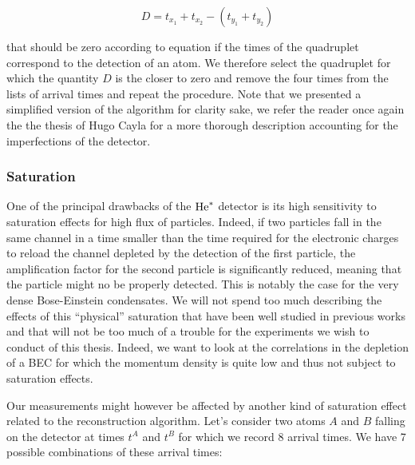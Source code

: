 \begin{equation}
    D = t_{x_1}+t_{x_2} - (t_{y_1}+t_{y_2})
\end{equation}

\noindent that should be zero according to equation \label{eq:tdet_MCP} if the times of the quadruplet correspond to the detection of an atom. We therefore select the quadruplet for which the quantity $D$ is the closer to zero and remove the four times from the lists of arrival times and repeat the procedure. Note that we presented a simplified version of the algorithm for clarity sake, we refer the reader once again the the thesis of Hugo Cayla \cite{cayla_these} for a more thorough description accounting for the imperfections of the detector.

\subsubsection{Saturation}

One of the principal drawbacks of the $\mathrm{He}^*$ detector is its high sensitivity to saturation effects for high flux of particles. Indeed, if two particles fall in the same channel in a time smaller than the time required for the electronic charges to reload the channel depleted by the detection of the first particle, the amplification factor for the second particle is significantly reduced, meaning that the particle might no be properly detected. This is notably the case for the very dense Bose-Einstein condensates. We will not spend too much describing the effects of this ``physical'' saturation that have been well studied in previous works \cite{carcy_these,cayla_these,edgar1992spatial,nogrette2015characterization} and that will not be too much of a trouble for the experiments we wish to conduct of this thesis. Indeed, we want to look at the correlations in the depletion of a BEC for which the momentum density is quite low and thus not subject to saturation effects.

Our measurements might however be affected by another kind of saturation effect related to the reconstruction algorithm. Let's consider two atoms $A$ and $B$ falling on the detector at times $t^A$ and $t^B$ for which we record 8 arrival times. We have 7 possible combinations of these arrival times:

